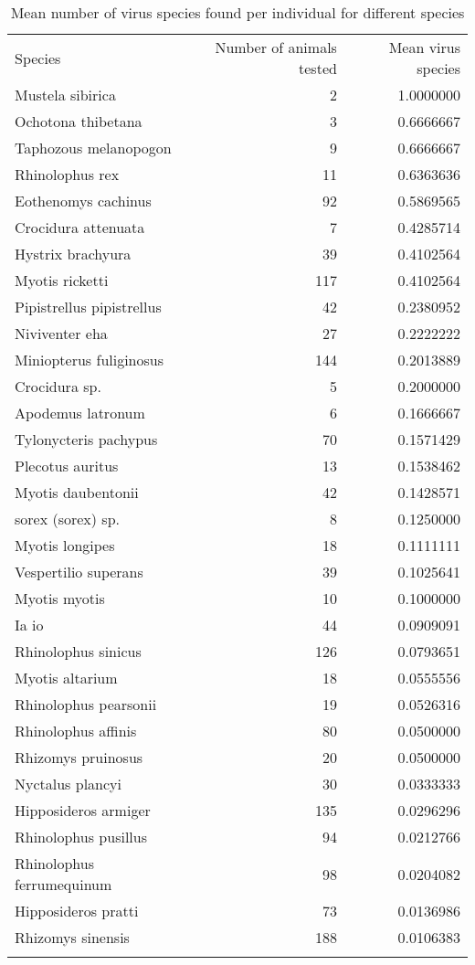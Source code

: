 \documentclass[11pt,article,oneside]{article}
\begin{document}
\begin{longtable}[c]{@{}lrr@{}}
\toprule\addlinespace
Species & Number of animals tested & Mean virus species
\\\addlinespace
\midrule\endhead
Mustela sibirica & 2 & 1.0000000
\\\addlinespace
Ochotona thibetana & 3 & 0.6666667
\\\addlinespace
Taphozous melanopogon & 9 & 0.6666667
\\\addlinespace
Rhinolophus rex & 11 & 0.6363636
\\\addlinespace
Eothenomys cachinus & 92 & 0.5869565
\\\addlinespace
Crocidura attenuata & 7 & 0.4285714
\\\addlinespace
Hystrix brachyura & 39 & 0.4102564
\\\addlinespace
Myotis ricketti & 117 & 0.4102564
\\\addlinespace
Pipistrellus pipistrellus & 42 & 0.2380952
\\\addlinespace
Niviventer eha & 27 & 0.2222222
\\\addlinespace
Miniopterus fuliginosus & 144 & 0.2013889
\\\addlinespace
Crocidura sp. & 5 & 0.2000000
\\\addlinespace
Apodemus latronum & 6 & 0.1666667
\\\addlinespace
Tylonycteris pachypus & 70 & 0.1571429
\\\addlinespace
Plecotus auritus & 13 & 0.1538462
\\\addlinespace
Myotis daubentonii & 42 & 0.1428571
\\\addlinespace
sorex (sorex) sp. & 8 & 0.1250000
\\\addlinespace
Myotis longipes & 18 & 0.1111111
\\\addlinespace
Vespertilio superans & 39 & 0.1025641
\\\addlinespace
Myotis myotis & 10 & 0.1000000
\\\addlinespace
Ia io & 44 & 0.0909091
\\\addlinespace
Rhinolophus sinicus & 126 & 0.0793651
\\\addlinespace
Myotis altarium & 18 & 0.0555556
\\\addlinespace
Rhinolophus pearsonii & 19 & 0.0526316
\\\addlinespace
Rhinolophus affinis & 80 & 0.0500000
\\\addlinespace
Rhizomys pruinosus & 20 & 0.0500000
\\\addlinespace
Nyctalus plancyi & 30 & 0.0333333
\\\addlinespace
Hipposideros armiger & 135 & 0.0296296
\\\addlinespace
Rhinolophus pusillus & 94 & 0.0212766
\\\addlinespace
Rhinolophus ferrumequinum & 98 & 0.0204082
\\\addlinespace
Hipposideros pratti & 73 & 0.0136986
\\\addlinespace
Rhizomys sinensis & 188 & 0.0106383
\\\addlinespace
\bottomrule
\addlinespace
\caption{Mean number of virus species found per individual for different
species}
\end{longtable}
\end{document}
